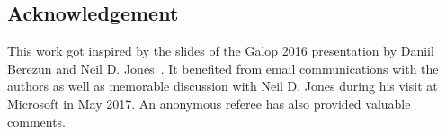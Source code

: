 \documentclass{elsarticle}
\theoremstyle{plain}
\theoremstyle{definition}
\begin{document}




\subsection*{Acknowledgement}
This work got inspired by the slides of the Galop 2016 presentation by Daniil Berezun and Neil D. Jones~\cite{berezunjones_partialevalbytraversals}. It benefited from email communications with the authors as well as memorable discussion with Neil D. Jones during his visit at Microsoft in May 2017.
An anonymous referee has also provided valuable comments.


\end{document}
